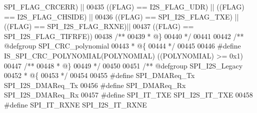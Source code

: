 \begin{DoxyCode}
      SPI_FLAG_CRCERR\textcolor{preprocessor}{)} \textcolor{preprocessor}{||}
00435                                    \textcolor{preprocessor}{(}\textcolor{preprocessor}{(}\textcolor{preprocessor}{FLAG}\textcolor{preprocessor}{)} \textcolor{preprocessor}{==} I2S_FLAG_UDR\textcolor{preprocessor}{)} \textcolor{preprocessor}{||} \textcolor{preprocessor}{(}\textcolor{preprocessor}{(}\textcolor{preprocessor}{FLAG}\textcolor{preprocessor}{)} \textcolor{preprocessor}{==} 
      I2S_FLAG_CHSIDE\textcolor{preprocessor}{)} \textcolor{preprocessor}{||}
00436                                    \textcolor{preprocessor}{(}\textcolor{preprocessor}{(}\textcolor{preprocessor}{FLAG}\textcolor{preprocessor}{)} \textcolor{preprocessor}{==} SPI_I2S_FLAG_TXE\textcolor{preprocessor}{)} \textcolor{preprocessor}{||} \textcolor{preprocessor}{(}\textcolor{preprocessor}{(}\textcolor{preprocessor}{FLAG}\textcolor{preprocessor}{)} \textcolor{preprocessor}{==} 
      SPI_I2S_FLAG_RXNE\textcolor{preprocessor}{)}\textcolor{preprocessor}{||}
00437                                    \textcolor{preprocessor}{(}\textcolor{preprocessor}{(}\textcolor{preprocessor}{FLAG}\textcolor{preprocessor}{)} \textcolor{preprocessor}{==} SPI_I2S_FLAG_TIFRFE\textcolor{preprocessor}{)}\textcolor{preprocessor}{)}
00438 \textcolor{comment}{/**}
00439 \textcolor{comment}{  * @\}}
00440 \textcolor{comment}{  */}
00441 
00442 \textcolor{comment}{/** @defgroup SPI\_CRC\_polynomial }
00443 \textcolor{comment}{  * @\{}
00444 \textcolor{comment}{  */}
00445 
00446 \textcolor{preprocessor}{#}\textcolor{preprocessor}{define} \textcolor{preprocessor}{IS\_SPI\_CRC\_POLYNOMIAL}\textcolor{preprocessor}{(}\textcolor{preprocessor}{POLYNOMIAL}\textcolor{preprocessor}{)} \textcolor{preprocessor}{(}\textcolor{preprocessor}{(}\textcolor{preprocessor}{POLYNOMIAL}\textcolor{preprocessor}{)} \textcolor{preprocessor}{>=} 0x1\textcolor{preprocessor}{)}
00447 \textcolor{comment}{/**}
00448 \textcolor{comment}{  * @\}}
00449 \textcolor{comment}{  */}
00450 
00451 \textcolor{comment}{/** @defgroup SPI\_I2S\_Legacy }
00452 \textcolor{comment}{  * @\{}
00453 \textcolor{comment}{  */}
00454 
00455 \textcolor{preprocessor}{#}\textcolor{preprocessor}{define} \textcolor{preprocessor}{SPI\_DMAReq\_Tx}                SPI_I2S_DMAReq_Tx
00456 \textcolor{preprocessor}{#}\textcolor{preprocessor}{define} \textcolor{preprocessor}{SPI\_DMAReq\_Rx}                SPI_I2S_DMAReq_Rx
00457 \textcolor{preprocessor}{#}\textcolor{preprocessor}{define} \textcolor{preprocessor}{SPI\_IT\_TXE}                   SPI_I2S_IT_TXE
00458 \textcolor{preprocessor}{#}\textcolor{preprocessor}{define} \textcolor{preprocessor}{SPI\_IT\_RXNE}                  SPI_I2S_IT_RXNE

\end{DoxyCode}
